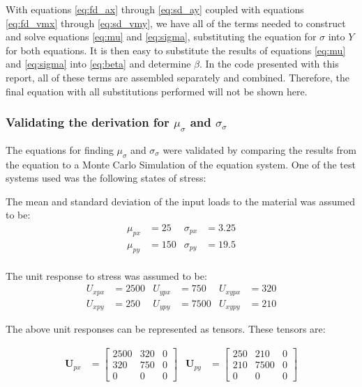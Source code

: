    With equations \ref{eq:fd_ax} through \ref{eq:sd_ay} coupled with equations \ref{eq:fd_vmx} through \ref{eq:sd_vmy}, we have all of the terms needed to construct and solve equations \ref{eq:mu} and \ref{eq:sigma}, substituting the equation for $\sigma$ into $Y$ for both equations. It is then easy to substitute the results of equations \ref{eq:mu} and \ref{eq:sigma} into \ref{eq:beta} and determine $\beta$.  In the code presented with this report, all of these terms are assembled separately and combined. Therefore, the final equation with all substitutions performed will not be shown here.

\subsubsection{Validating the derivation for $\mu_\sigma$ and $\sigma_\sigma$}
The equations for finding $\mu_\sigma$ and $\sigma_\sigma$ were validated by comparing the results from the equation to a Monte Carlo Simulation of the equation system. One of the test systems used was the following states of stress:

The mean and standard deviation of the input loads to the material was assumed to be:
\begin{align*}
    \mu_{px} &= 25 &\sigma_{px} &= 3.25\\
    \mu_{py} &= 150 &\sigma_{py} &= 19.5\\
\end{align*}

The unit response to stress was assumed to be: 
\begin{align*}
    U_{xpx} &= 2500  &U_{ypx} &= 750  &U_{xypx} &= 320\\
    U_{xpy} &= 250  &U_{ypy} &= 7500  &U_{xypy} &= 210
\end{align*}

The above unit responses can be represented as tensors. These tensors are: 

\begin{align*}
\mathbf{U}_{px} &= \left[ 
\begin{matrix}
2500 & 320 & 0\\
320 & 750 & 0\\
0 & 0 & 0
\end{matrix}
\right]
&\mathbf{U}_{py} &= \left[
\begin{matrix}
250&210&0\\
210&7500&0\\
0&0&0
\end{matrix}
\right]
\end{align*}

